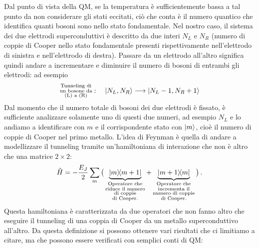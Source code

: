 \noindent Dal punto di vista della QM, se la temperatura è sufficientemente bassa a tal punto da non considerare gli stati eccitati, ciò che conta è il numero quantico che identifica quanti bosoni sono nello stato fondamentale. Nel nostro caso, il sistema dei due elettrodi superconduttivi è descritto da due interi $N_L$ e $N_R$ (numero di coppie di Cooper nello stato fondamentale presenti rispettivamente nell'elettrodo di sinistra e nell'elettrodo di destra). Passare da un elettrodo all'altro significa quindi andare a incrementare e diminuire il numero di bosoni di entrambi gli elettrodi: ad esempio
\begin{equation*}
    \substack{\text{Tunneling di} \\ \text{un bosone da} \\ \text{(L) a (R)}}: \quad \ket{N_L, N_R} \longrightarrow \ket{N_L-1, N_R+1}
\end{equation*}
Dal momento che il numero totale di bosoni dei due elettrodi è fissato, è sufficiente analizzare solamente uno di questi due numeri, ad esempio $N_L$ e lo andiamo a identificare con $m$ e il corrispondente stato con $\ket m$, cioè il numero di coppie di Cooper nel primo metallo. L'idea di Feynman è quella di andare a modellizzare il tunneling tramite un'hamiltoniana di interazione che non è altro che una matrice $2 \times 2$:
\begin{equation*}
    \hat H = -\frac{E_J}{2}\sum_m\big(\underbrace{\op{m}{m+1}}_{\substack{\text{Operatore che} \\ \text{riduce il numero} \\ \text{di coppie} \\ \text{di Cooper.}}}+\underbrace{\op{m+1}{m}}_{\substack{\text{Operatore che} \\ \text{incrementa il} \\ \text{numero di coppie} \\ \text{di Cooper.}}}\big) \, .
\end{equation*}
Questa hamiltoniana è caratterizzata da due operatori che non fanno altro che eseguire il tunneling di una coppia di Cooper da un metallo superconduttivo all'altro. Da questa definizione si possono ottenere vari risultati che ci limitiamo a citare, ma che possono essere verificati con semplici conti di QM:
